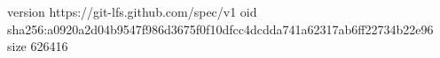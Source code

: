 version https://git-lfs.github.com/spec/v1
oid sha256:a0920a2d04b9547f986d3675f0f10dfcc4dcdda741a62317ab6ff22734b22e96
size 626416
